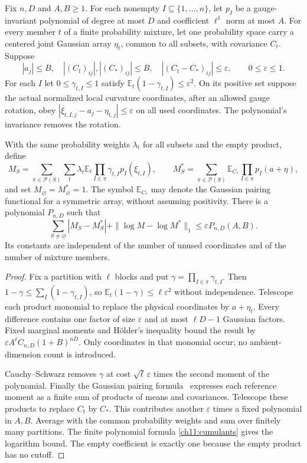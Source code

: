 \begin{proposition}
\label{ch11:joint-gaussian}
Fix $n,D$ and $A,B\ge1$. For each nonempty $I\subseteq\{1,\ldots,n\}$,
let $p_I$ be a gauge-invariant polynomial of degree at most $D$ and
coefficient $\ell^1$ norm at most $A$.
For every member $t$ of a finite probability mixture, let one probability
space carry a centered joint Gaussian array $\eta_t$, common to all
subsets, with covariance $C_t$. Suppose
\[
 |a_j|\le B,\quad |(C_t)_{ij}|,|(C_*)_{ij}|\le B,\quad
 |(C_t-C_*)_{ij}|\le\varepsilon,\qquad 0\le\varepsilon\le1.
\]
For each $I$ let $0\le\gamma_{t,I}\le1$ satisfy
$\mathbb E_t(1-\gamma_{t,I})\le\varepsilon^2$.
On its positive set suppose the actual normalized local curvature
coordinates, after an allowed gauge rotation, obey
$|\xi_{t,I,j}-a_j-\eta_{t,j}|\le\varepsilon$ on all used coordinates.
The polynomial's invariance removes the rotation.

With the same probability weights $\lambda_t$ for all subsets and the empty product,
define
\[
 M_S=\sum_{\pi\in\mathcal P(S)}\sum_t\lambda_t
       \mathbb E_t\prod_{I\in\pi}\gamma_{t,I}p_I(\xi_{t,I}),\qquad
 M_S^*=\sum_{\pi\in\mathcal P(S)}
       \mathbb E_{C_*}\prod_{I\in\pi}p_I(a+\eta),
\]
and set $M_\varnothing=M_\varnothing^*=1$.
The symbol $\mathbb E_{C_*}$ may denote the Gaussian pairing
functional for a symmetric array, without assuming positivity.
There is a polynomial $P_{n,D}$ such that
\[
 \sum_{S\ne\varnothing}|M_S-M_S^*|
       +\|\log M-\log M^*\|_1
       \le\varepsilon P_{n,D}(A,B).
\]
Its constants are independent of the number of unused coordinates
and of the number of mixture members.
\end{proposition}
\begin{proof}
Fix a partition with $\ell$ blocks and put
$\gamma=\prod_{I\in\pi}\gamma_{t,I}$.
Then $1-\gamma\le\sum_I(1-\gamma_{t,I})$, so
$\mathbb E_t(1-\gamma)\le\ell\varepsilon^2$ without independence.
Telescope each product monomial to replace the physical coordinates
by $a+\eta_t$. Every difference contains one factor of size
$\varepsilon$ and at most $\ell D-1$ Gaussian factors.
Fixed marginal moments and H{\"o}lder's inequality bound the result by
$\varepsilon A^\ell C_{n,D}(1+B)^{nD}$.
Only coordinates in that monomial occur; no ambient-dimension count
is introduced.

Cauchy--Schwarz removes $\gamma$ at cost
$\sqrt\ell\,\varepsilon$ times the second moment of the polynomial.
Finally the Gaussian pairing formula~\cite{Isserlis1918} expresses each
reference moment as a finite sum of products of means and covariances.
Telescope these products to replace $C_t$ by $C_*$.
This contributes another $\varepsilon$ times a fixed polynomial in $A,B$.
Average with the common probability weights and sum over finitely many
partitions. The finite polynomial formula \eqref{ch11:cumulants} gives
the logarithm bound. The empty coefficient is exactly one because
the empty product has no cutoff.
\end{proof}

